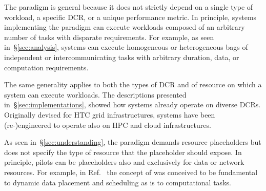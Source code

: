 \documentclass{sig-alternate}
\begin{document}

The \pilot paradigm is general because it does not strictly depend on a single
type of workload, a specific DCR, or a unique performance metric. In principle,
systems implementing the \pilot paradigm can execute workloads composed of an
arbitrary number of tasks with disparate requirements. For example, as seen
in~\S\ref{sec:analysis}, \pilot systems can execute homogeneous or heterogeneous
bags of independent or intercommunicating tasks with arbitrary duration, data,
or computation requirements.

The same generality applies to both the types of DCR and of resource on which a
\pilot system can execute workloads. The descriptions presented
in~\S\ref{sec:implementations}, showed how \pilot systems already operate on
diverse DCRs. Originally devised for HTC grid infrastructures, \pilot systems
have been (re-)engineered to operate also on HPC and cloud infrastructures.

As seen in~\S\ref{sec:understanding}, the \pilot paradigm demands resource
placeholders but does not specify the type of resource that the placeholder
should expose. In principle, pilots can be placeholders also and exclusively for
data or network resources. For example, in
Ref.~\cite{luckow2014pilot,santcroos2012} the concept of \pilotdata was
conceived to be fundamental to dynamic data placement and scheduling as \pilot
is to computational tasks.



\end{document}
